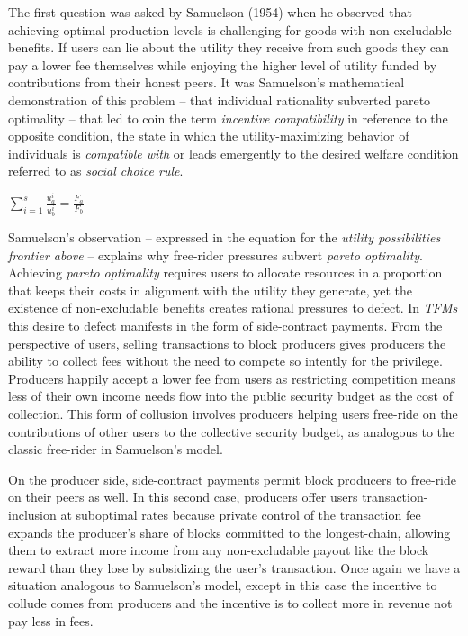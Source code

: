 The first question was asked by Samuelson (1954) when he observed that achieving optimal production levels is challenging for goods with non-excludable benefits. If users can lie about the utility they receive from such goods they can pay a lower fee themselves while enjoying the higher level of utility funded by contributions from their honest peers. It was Samuelson's mathematical demonstration of this problem -- that individual rationality subverted pareto optimality -- that led \citet{hurwicz1960optimality} to coin the term \textit{incentive compatibility} in reference to the opposite condition, the state in which the utility-maximizing behavior of individuals is \textit{compatible with} or leads emergently to the desired welfare condition referred to as \textit{social choice rule}.

\LARGE
\begin{adjustwidth}{1.5em}{1.5em}
\begin{math}
\sum_{i=1}^{s} \frac{u_a^i}{u_b^i} = \frac{F_a}{F_b}
\end{math}
\end{adjustwidth}
\normalsize

Samuelson's observation -- expressed in the equation for the \textit{utility possibilities frontier above} -- explains why free-rider pressures subvert \textit{pareto optimality}. Achieving \textit{pareto optimality} requires users to allocate resources in a proportion that keeps their costs in alignment with the utility they generate, yet the existence of non-excludable benefits creates rational pressures to defect. In \textit{TFMs} this desire to defect manifests in the form of side-contract payments. From the perspective of users, selling transactions to block producers gives producers the ability to collect fees without the need to compete so intently for the privilege. Producers happily accept a lower fee from users as restricting competition means less of their own income needs flow into the public security budget as the cost of collection. This form of collusion involves producers helping users free-ride on the contributions of other users to the collective security budget, as analogous to the classic free-rider in Samuelson's model.

On the producer side, side-contract payments permit block producers to free-ride on their peers as well. In this second case, producers offer users transaction-inclusion at suboptimal rates because private control of the transaction fee expands the producer's share of blocks committed to the longest-chain, allowing them to extract more income from any non-excludable payout like the block reward than they lose by subsidizing the user's transaction. Once again we have a situation analogous to Samuelson's model, except in this case the incentive to collude comes from producers and the incentive is to collect more in revenue not pay less in fees.

